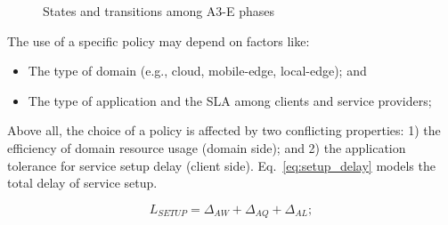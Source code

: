 \begin{figure}[tbp]
	\raggedright
	\hfill
	
	\hfill
	\caption{States and transitions among A3-E phases} \label{fig:A3-E-states}
\end{figure}

The use of a specific policy may depend on factors like:

\begin{itemize}

\item The type of domain (e.g., cloud, mobile-edge, local-edge); and

\item The type of application and the SLA among clients and service  providers;

\end{itemize}

Above all, the choice of a policy is affected by two conflicting properties: 1) the efficiency of domain resource usage (domain side); and 2) the application tolerance for service setup delay (client side). Eq.~\ref{eq:setup_delay} models the total delay of service setup.

\begin{equation}\label{eq:setup_delay}
L_{SETUP} = \Delta_{AW} + \Delta_{AQ} + \Delta_{AL};
\end{equation}



